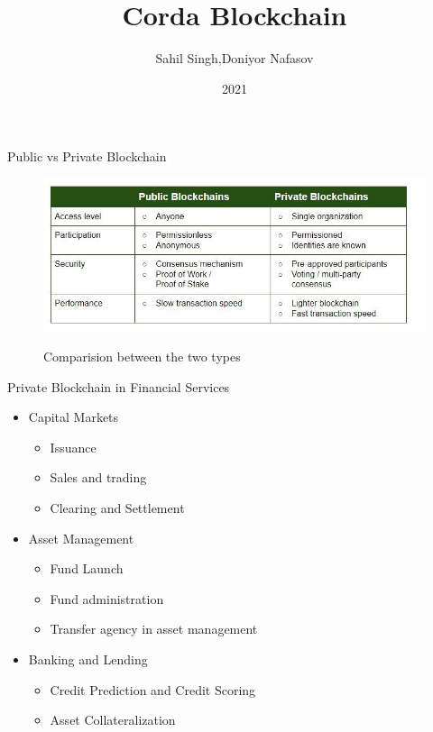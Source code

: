 \documentclass{beamer}
\title{Corda Blockchain}
\author{Sahil Singh,Doniyor Nafasov}
\institute{University of Sussex}
\date{2021}
\begin{document}
\frame{\titlepage}

\begin{frame}{Public vs Private Blockchain}

\begin{figure}
	\includegraphics[width=\textwidth,height=\textheight,keepaspectratio]{privpublic.jpeg}
	\caption{Comparision between the two types} \nocite{luxtag}
  \label{fig:boat1}
\end{figure}

\end{frame}
\begin{frame}{Private Blockchain in Financial Services}
\begin{itemize}
\item Capital Markets
\begin{itemize}
    \item Issuance
    \item Sales and trading
    \item Clearing and Settlement
	\\[1ex]
\end{itemize}
\item Asset Management
\begin{itemize}
    \item Fund Launch
    \item Fund administration
    \item Transfer agency in asset management
	\\[1ex]
\end{itemize}
\item Banking and Lending
\begin{itemize}
    \item Credit Prediction and Credit Scoring
    \item Asset Collateralization
\end{itemize}




\end{itemize}


\end{frame}
\end{document}
